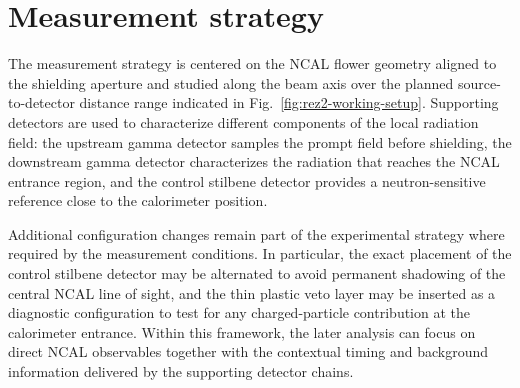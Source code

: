 \section{Measurement strategy}

The measurement strategy is centered on the NCAL flower geometry aligned to the shielding aperture and studied along the beam axis over the planned source-to-detector distance range indicated in Fig.~\ref{fig:rez2-working-setup}. Supporting detectors are used to characterize different components of the local radiation field: the upstream gamma detector samples the prompt field before shielding, the downstream gamma detector characterizes the radiation that reaches the NCAL entrance region, and the control stilbene detector provides a neutron-sensitive reference close to the calorimeter position.

Additional configuration changes remain part of the experimental strategy where required by the measurement conditions. In particular, the exact placement of the control stilbene detector may be alternated to avoid permanent shadowing of the central NCAL line of sight, and the thin plastic veto layer may be inserted as a diagnostic configuration to test for any charged-particle contribution at the calorimeter entrance. Within this framework, the later analysis can focus on direct NCAL observables together with the contextual timing and background information delivered by the supporting detector chains.